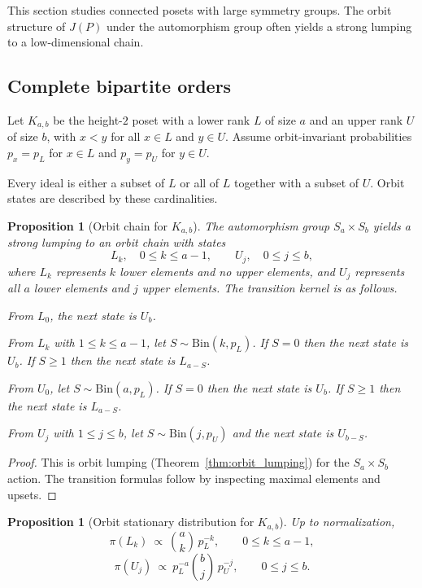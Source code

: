 \documentclass[final,3p,times]{elsarticle}
\newtheorem{proposition}[theorem]{Proposition}
\theoremstyle{definition}
\begin{document}
This section studies connected posets with large symmetry groups.
The orbit structure of $J(P)$ under the automorphism group often yields a strong lumping to a low-dimensional chain.

\subsection{Complete bipartite orders}

Let $K_{a,b}$ be the height-$2$ poset with a lower rank $L$ of size $a$ and an upper rank $U$ of size $b$, with $x<y$ for all $x\in L$ and $y\in U$.
Assume orbit-invariant probabilities $p_x=p_L$ for $x\in L$ and $p_y=p_U$ for $y\in U$.

Every ideal is either a subset of $L$ or all of $L$ together with a subset of $U$.
Orbit states are described by these cardinalities.

\begin{proposition}[Orbit chain for $K_{a,b}$]\label{prop:K_ab_orbit_chain}
The automorphism group $S_a\times S_b$ yields a strong lumping to an orbit chain with states
\[
L_k,\quad 0\le k\le a-1,\qquad
U_j,\quad 0\le j\le b,
\]
where $L_k$ represents $k$ lower elements and no upper elements, and $U_j$ represents all $a$ lower elements and $j$ upper elements.
The transition kernel is as follows.

From $L_0$, the next state is $U_b$.

From $L_k$ with $1\le k\le a-1$, let $S\sim \mathrm{Bin}(k,p_L)$.
If $S=0$ then the next state is $U_b$.
If $S\ge 1$ then the next state is $L_{a-S}$.

From $U_0$, let $S\sim \mathrm{Bin}(a,p_L)$.
If $S=0$ then the next state is $U_b$.
If $S\ge 1$ then the next state is $L_{a-S}$.

From $U_j$ with $1\le j\le b$, let $S\sim \mathrm{Bin}(j,p_U)$ and the next state is $U_{b-S}$.
\end{proposition}

\begin{proof}
This is orbit lumping (Theorem~\ref{thm:orbit_lumping}) for the $S_a\times S_b$ action.
The transition formulas follow by inspecting maximal elements and upsets.
\end{proof}

\begin{proposition}[Orbit stationary distribution for $K_{a,b}$]\label{prop:K_ab_stationary}
Up to normalization,
\[
\pi(L_k)\ \propto\ \binom{a}{k}\,p_L^{-k},\qquad 0\le k\le a-1,
\]
\[
\pi(U_j)\ \propto\ p_L^{-a}\binom{b}{j}\,p_U^{-j},\qquad 0\le j\le b.
\]
\end{proposition}
\end{document}
